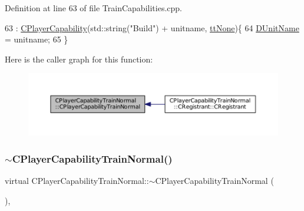 Definition at line 63 of file Train\+Capabilities.\+cpp.


\begin{DoxyCode}
63                                                                                     : 
      \hyperlink{classCPlayerCapability_a303de62aba5d3f65d9a8e013c64a96c1}{CPlayerCapability}(std::string(\textcolor{stringliteral}{"Build"}) + unitname, \hyperlink{classCPlayerCapability_a9d3450ed1532fd536bd6cbb1e2eef02fac78f0e806a6b0ead030d63c27c9ce929}{ttNone})\{
64     \hyperlink{classCPlayerCapabilityTrainNormal_aed40686355e78c151910e23ea2d9d32c}{DUnitName} = unitname;
65 \}
\end{DoxyCode}
Here is the caller graph for this function\+:
\nopagebreak
\begin{figure}[H]
\begin{center}
\leavevmode
\includegraphics[width=350pt]{classCPlayerCapabilityTrainNormal_a80b62a5131937c8230bf6229626dc53c_icgraph}
\end{center}
\end{figure}
\hypertarget{classCPlayerCapabilityTrainNormal_a1cc40f48e17f7e7fab3af09a85b4eb0f}{}\label{classCPlayerCapabilityTrainNormal_a1cc40f48e17f7e7fab3af09a85b4eb0f} 
\subsubsection{\texorpdfstring{$\sim$\+C\+Player\+Capability\+Train\+Normal()}{~CPlayerCapabilityTrainNormal()}}
{\footnotesize\ttfamily virtual C\+Player\+Capability\+Train\+Normal\+::$\sim$\+C\+Player\+Capability\+Train\+Normal (\begin{DoxyParamCaption}{ }\end{DoxyParamCaption})\hspace{0.3cm}{\ttfamily [inline]}, {\ttfamily [virtual]}}



